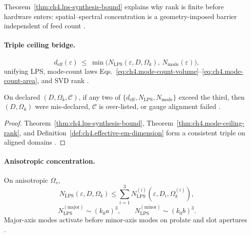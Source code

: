 Theorem~\ref{thm:ch4.lps-synthesis-bound} explains why rank is finite before hardware enters: spatial--spectral concentration is a geometry-imposed
barrier independent of feed count \cite{hansen1988,stratton1941,harrington2001}.

\paragraph{Triple ceiling bridge.}
\begin{equation}
\label{eq:ch4.lps-export-bridge}
d_{\mathrm{eff}}(\varepsilon)\ \le\ \min\big(N_{\mathrm{LPS}}(\varepsilon,D,\Omega_{k}),\,N_{\mathrm{mode}}(\varepsilon)\big),
\end{equation}
unifying LPS, mode-count laws Eqs.~\eqref{eq:ch4.mode-count-volume}--\eqref{eq:ch4.mode-count-area}, and SVD rank \cite{hansen1988,stratton1941,harrington2001}.

\begin{theorem}
\label{thm:ch4.triple-ceiling}
On declared \((D,\Omega_{k},\mathcal{C})\), if any two of \(\{d_{\mathrm{eff}},N_{\mathrm{LPS}},N_{\mathrm{mode}}\}\) exceed the third, then
\((D,\Omega_{k})\) were mis-declared, \(\mathcal{C}\) is over-listed, or gauge alignment failed \cite{hansen1988,harrington2001,devaney2004,stratton1941}.
\end{theorem}
\begin{proof}
Theorem~\ref{thm:ch4.lps-synthesis-bound}, Theorem~\ref{thm:ch4.mode-ceiling-rank}, and Definition~\ref{def:ch4.effective-em-dimension} form a
consistent triple on aligned domains \cite{stratton1941,hansen1988,harrington2001}.
\end{proof}

\paragraph{Anisotropic concentration.}
On anisotropic \(\Omega_{s}\),
\begin{equation}
\label{eq:ch4.lps-anisotropy}
N_{\mathrm{LPS}}(\varepsilon,D,\Omega_{k})\le\sum_{i=1}^{3}N_{\mathrm{LPS}}^{(i)}(\varepsilon,D_{i},\Omega_{k}^{(i)}),
\end{equation}
\begin{equation}
\label{eq:ch4.prolate-nwidth}
N_{\mathrm{LPS}}^{(\mathrm{major})}\sim(k_{0}a)^{3},\qquad N_{\mathrm{LPS}}^{(\mathrm{minor})}\sim(k_{0}b)^{3}.
\end{equation}
Major-axis modes activate before minor-axis modes on prolate and slot apertures \cite{hansen1988,jackson1999,collin2001,harrington2001}.

